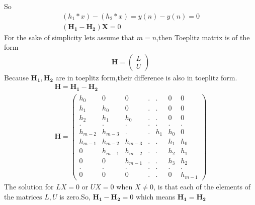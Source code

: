\documentclass[journal,12pt,twocolumn]{IEEEtran}
\providecommand{\brak}[1]{\ensuremath{\left(#1\right)}}
\newcommand{\myvec}[1]{\ensuremath{\begin{pmatrix}#1\end{pmatrix}}}
\numberwithin{equation}{subsection}
\let\vec\mathbf
\begin{document}
So
\begin{align}
    \brak{h_1\ast x}-\brak{h_2\ast x}=y(n)-y(n)=0\\
    (\vec{H_1}-\vec{H_2})\vec{X}=0
\end{align}
For the sake of simplicity lets assume that $m=n$,then Toeplitz matrix is of the form
\begin{align}
    \vec{H}=\myvec{L\\U}
\end{align}
Because $\vec{H_1},\vec{H_2}$ are in toeplitz form,their difference is also in toeplitz form.
\begin{align}
    \vec{H}=\vec{H_1}-\vec{H_2}\\
    \vec{H}=\myvec{h_0&0&0&.&.&0&0\\h_1&h_0&0&.&.&0&0\\h_2&h_1&h_0&.&.&0&0\\.&.&.&.&.&.&.\\h_{m-2}&h_{m-3}&.&.&h_{1}&h_{0}&0\\h_{m-1}&h_{m-2}&h_{m-3}&.&.&h_{1}&h_{0}\\0&h_{m-1}&h_{m-2}&.&.&h_{2}&h_{1}\\0&0&h_{m-1}&.&.&h_{3}&h_{2}\\.&.&.&.&.&.&.\\0&0&0&.&.&0&h_{m-1}}
\end{align}
The solution for $LX=0$ or $UX=0$ when $X\neq 0$, is that each of the elements of the matrices $L,U$ is zero.So, $\vec{H_1}-\vec{H_2}=0$ which means $\vec{H_1}=\vec{H_2}$
\end{document}
